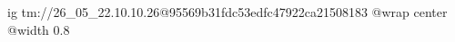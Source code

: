  
 
 
 
 

\qqSecOrig


\ifcmt
  ig tm://26_05_22.10.10.26@95569b31fdc53edfc47922ca21508183
  @wrap center
  @width 0.8
\fi

